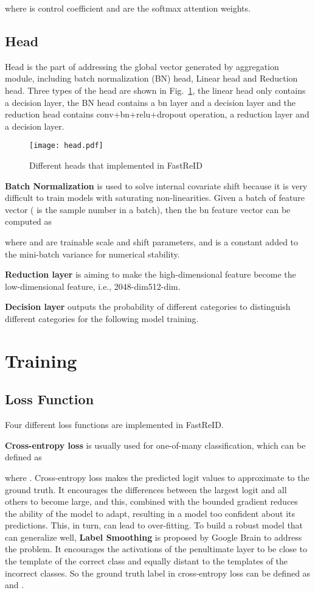 \documentclass[10pt,twocolumn,letterpaper]{article}
\begin{document}
where  is control coefficient and  are the softmax attention weights.

\subsection{Head}
Head is the part of addressing the global vector generated by aggregation module, including batch normalization (BN) head, Linear head and Reduction head. Three types of the head are shown in Fig.~\ref{fig4}, the linear head only contains a decision layer, the BN head contains a bn layer and a decision layer and the reduction head contains conv+bn+relu+dropout operation, a reduction layer and a decision layer. 
\begin{figure}[t]
    \centering
       \vspace{0em}
    \texttt{[image: head.pdf]}
     \caption{Different heads that implemented in FastReID}\label{fig4}
\end{figure}

\noindent\textbf{Batch Normalization} \cite{ioffe2015batch} is used to solve internal covariate shift because it is very difficult to train models with saturating non-linearities. Given a batch of feature vector  ( is the sample number in a batch), then the bn feature vector  can be computed as


where  and  are trainable scale and shift parameters, and  is a constant added to the mini-batch variance for numerical stability.

\noindent\textbf{Reduction layer} is aiming to make the high-dimensional feature become the low-dimensional feature, i.e., 2048-dim512-dim.

\noindent\textbf{Decision layer} outputs the probability of different categories to distinguish different categories for the following model training.
\section{Training}
\subsection{Loss Function}
Four different loss functions are implemented in FastReID. 

\noindent\textbf{Cross-entropy loss} is usually used for one-of-many classification, which can be defined as

where . Cross-entropy loss makes the predicted logit values to approximate to the ground truth. It encourages the differences between the largest logit and all others to become large, and this, combined with the bounded gradient reduces the ability of the model to adapt, resulting in a model too confident about its predictions. This, in turn, can lead to over-fitting. To build a robust model that can generalize well, \textbf{Label Smoothing} is proposed by Google Brain to address the problem. It encourages the activations of the penultimate layer to be close to the template of the correct class and equally distant to the templates of the incorrect classes. So the ground truth label  in cross-entropy loss can be defined as  and .
\end{document}
